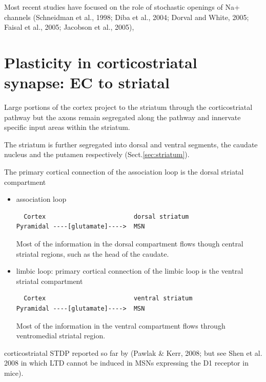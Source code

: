 Most recent studies have focused on the role of stochastic openings of Na+
channels (Schneidman et al., 1998; Diba et al., 2004; Dorval and White, 2005;
Faisal et al., 2005; Jacobson et al., 2005),



\section{Plasticity in corticostriatal synapse: EC to striatal}
\label{sec:corticostriatal-synaptic-plasticity}

Large portions of the cortex project to the striatum through the corticostriatal
pathway but the axons remain segregated along the pathway and innervate specific
input areas within the striatum.

The striatum is further segregated into dorsal and ventral segments, the caudate
nucleus and the putamen respectively (Sect.\ref{sec:striatum}).

The primary cortical connection of the association loop is the dorsal striatal
compartment
\begin{itemize}

  \item association loop

\begin{verbatim}
  Cortex						dorsal striatum
Pyramidal ----[glutamate]---->  MSN
\end{verbatim}

Most of the information in the dorsal compartment flows though central striatal
regions, such as the head of the caudate.
  
  \item limbic loop: primary cortical connection of the limbic loop is the
  ventral striatal compartment

\begin{verbatim}
  Cortex						ventral striatum
Pyramidal ----[glutamate]---->  MSN
\end{verbatim}

Most of the information in the ventral compartment flows through ventromedial
striatal region.

\end{itemize}

corticostriatal STDP reported so far by (Pawlak \& Kerr, 2008; but see Shen et
al. 2008 in which LTD cannot be induced in MSNs expressing the D1 receptor in
mice).

